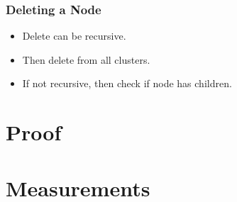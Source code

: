 \documentclass[10pt, compress]{beamer}
\begin{document}
\begin{frame}[fragile]
    \frametitle{Deleting a Node}
    \begin{itemize}
        \item Delete can be recursive.
        \item Then delete from all clusters.
        \item If not recursive, then check if node has children.
    \end{itemize}
\end{frame}

\section{Proof}
\begin{frame}
\end{frame}

\section{Measurements}
\begin{frame}
\end{frame}

\end{document}
